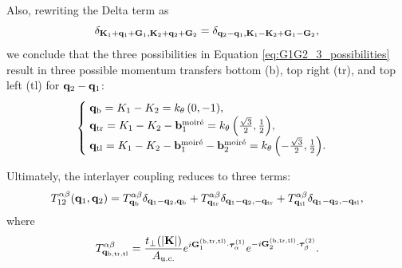 Also, rewriting the Delta term as
\begin{equation} \label{eq:delta-term}
\delta_{{\vb{K}}_1 + {\vb{q}}_1 + {\vb{G}}_1, {\vb{K}}_2 + {\vb{q}}_2 + {\vb{G}}_2} = \delta_{{\vb{q}}_2 - {\vb{q}}_1, {\vb{K}}_1 - {\vb{K}}_2 + {\vb{G}}_1 - {\vb{G}}_2},
\end{equation}
we conclude that the three possibilities in Equation \ref{eq:G1G2_3_possibilities} result in three possible momentum transfers bottom (b), top right (tr), and top left (tl) for ${\vb{q}}_2-{\vb{q}}_1$:
\begin{equation} \label{eq:qb_qtr_qtl}
\begin{cases}
\; {\vb{q}}_\text{b} = K_1 - K_2 = k_\theta \, (0, -1), \\
\; {\vb{q}}_\text{tr} = K_1 - K_2 - {\vb{b}}_1^{\text{moiré}} = k_\theta \, \qty(\frac{\sqrt{3}}{2}, \frac{1}{2}), \\
\; {\vb{q}}_\text{tl} = K_1 - K_2 -{\vb{b}}_1^{\text{moiré}}-{\vb{b}}_2^{\text{moiré}} = k_\theta \, \qty(-\frac{\sqrt{3}}{2}, \frac{1}{2}).
\end{cases}
\end{equation}

Ultimately, the interlayer coupling reduces to three terms:
\begin{equation} \label{eq:interlayer-3terms}
T_{12}^{\alpha\beta}({\vb{q}}_1, {\vb{q}}_2) = T^{\alpha\beta}_{{\vb{q}}_\text{b}} \delta_{{\vb{q}}_1 - {\vb{q}}_2, {\vb{q}}_\text{b}}
+ T^{\alpha\beta}_{{\vb{q}}_\text{tr}} \delta_{{\vb{q}}_1 - {\vb{q}}_2, -{\vb{q}}_\text{tr}}
+ T^{\alpha\beta}_{{\vb{q}}_\text{tl}} \delta_{{\vb{q}}_1 - {\vb{q}}_2, -{\vb{q}}_\text{tl}},
\end{equation}
where
\begin{equation} \label{eq:interlayer-tensor}
T^{\alpha\beta}_{{\vb{q}}_{\text{b},\text{tr},\text{tl}}} = \frac{t_\perp(\abs{{\vb{K}}})}{A_{\text{u.c.}}} e^{i {\vb{G}}_{1}^{(\text{b},\text{tr},\text{tl})} \cdot \bm{\tau}_{\alpha}^{(1)}}
e^{-i {\vb{G}}_{2}^{(\text{b},\text{tr},\text{tl})} \cdot \bm{\tau}_{\beta}^{(2)}}.
\end{equation}


